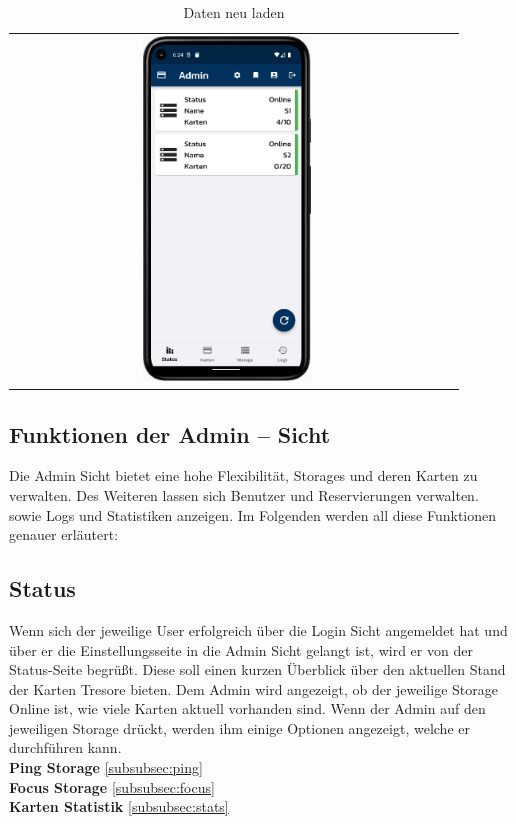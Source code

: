 \vspace{1cm}
\begin{table}[htbp]
  \centering
  \begin{tabular}{cc}
    \includegraphics[width=0.4\textwidth]{FLUTTER/images/ZB/status_page.png}  \\
  \end{tabular}
  \label{tab:example}
  \captionsetup{type=figure}
  \caption{Daten neu laden}
\end{table}

\newpage

\subsection{Funktionen der Admin – Sicht}
Die Admin Sicht bietet eine hohe Flexibilität, Storages und deren Karten zu verwalten. Des Weiteren lassen sich Benutzer und Reservierungen verwalten. sowie Logs und Statistiken anzeigen. Im Folgenden werden all diese Funktionen genauer erläutert:

\subsection{Status}
Wenn sich der jeweilige User erfolgreich über die Login Sicht angemeldet hat und über er die Einstellungsseite in die Admin Sicht gelangt ist, wird er von der Status-Seite begrüßt. Diese soll einen kurzen Überblick über den aktuellen Stand der Karten Tresore bieten. Dem Admin wird angezeigt, ob der jeweilige Storage Online ist, wie viele Karten aktuell vorhanden sind. Wenn der Admin auf den jeweiligen Storage drückt, werden ihm einige Optionen angezeigt, welche er durchführen kann.
\vspace{3cm}
\\
\vspace{3cm}
\textbf{Ping Storage} \ref{subsubsec:ping}
\\
\vspace{3cm}
\textbf{Focus Storage} \ref{subsubsec:focus}
\\
\vspace{3cm}
\textbf{Karten Statistik} \ref{subsubsec:stats}

